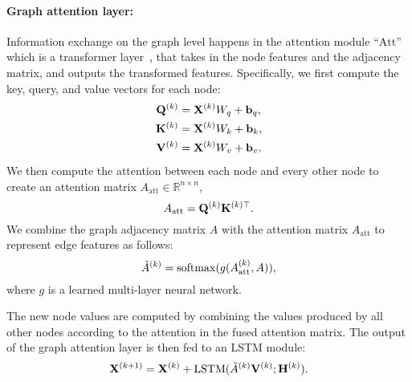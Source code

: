 \paragraph{Graph attention layer:} Information exchange on the graph level happens in the attention
module ``$\mathrm{Att}$'' which is a transformer layer~\cite{gtn}, that takes in the node features
and the adjacency matrix, and outputs the transformed features. Specifically, we first compute the
key, query, and value vectors for each node:
\begin{align}
  \mathbf{Q}^{(k)} &= \mathbf{X}^{(k)} W_q + \mathbf{b}_q, \\
  \mathbf{K}^{(k)} &= \mathbf{X}^{(k)} W_k + \mathbf{b}_k, \\
  \mathbf{V}^{(k)} &= \mathbf{X}^{(k)} W_v + \mathbf{b}_v.
\end{align}
We then compute the attention between each node and every other node to create an attention matrix
$A_{\text{att}} \in \mathbb{R}^{n \times n}$,
\begin{equation}
  A_{\text{att}} = \mathbf{Q}^{(k)} \mathbf{K}^{(k)\top}.
\end{equation}
We combine the graph adjacency matrix $A$ with the attention matrix $A_{\text{att}}$ to represent
edge features as follows:
\begin{equation}
  \tilde{A}^{(k)} = \mathop{\mathrm{softmax}}(g(A_{\text{att}}^{(k)}, A)),
\end{equation}
where $g$ is a learned multi-layer neural network.


The new node values are computed by combining the values produced by all other nodes
according to the attention in the fused attention matrix. The output of the graph attention layer is
then fed to an LSTM module:
\begin{equation}
  \mathbf{X}^{(k+1)} = \mathbf{X}^{(k)} + \mathop{\mathrm{LSTM}}(\tilde{A}^{(k)} \mathbf{V}^{(k)}; \mathbf{H}^{(k)}).
\end{equation}

